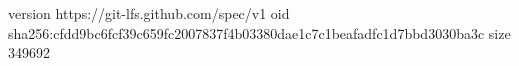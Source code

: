 version https://git-lfs.github.com/spec/v1
oid sha256:cfdd9bc6fcf39c659fc2007837f4b03380dae1c7c1beafadfc1d7bbd3030ba3c
size 349692
